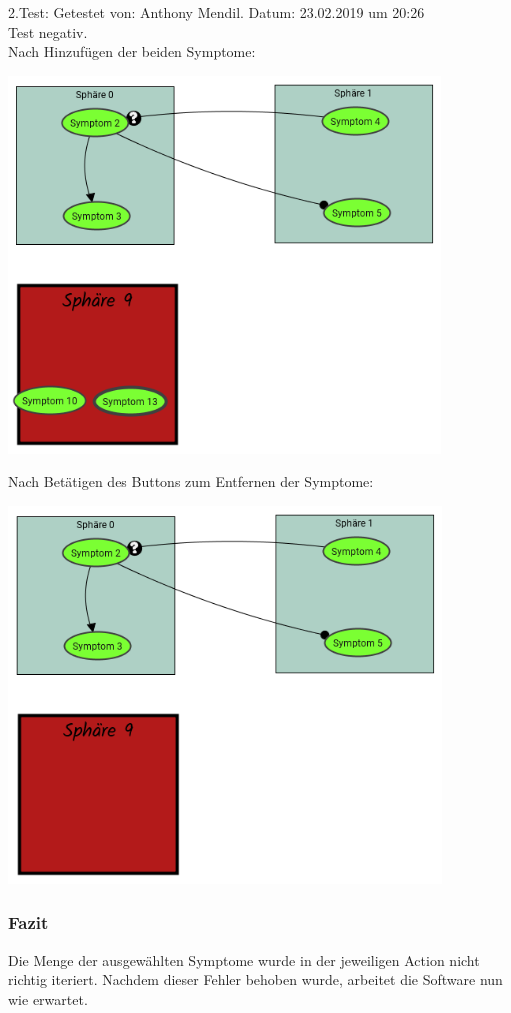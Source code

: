 \documentclass[enabledeprecatedfontcommands]{scrartcl}
\begin{document}
2.Test: Getestet von: Anthony Mendil. Datum: 23.02.2019 um 20:26 \\
Test negativ. \\
Nach Hinzufügen der beiden Symptome: 
\begin{center}
\includegraphics[height=10cm]{2_22vorher.PNG}
\end{center}
Nach Betätigen des Buttons zum Entfernen der Symptome: 
\begin{center}
\includegraphics[height=10cm]{2_22.PNG}
\end{center}
\subsubsection{Fazit}
Die Menge der ausgewählten Symptome wurde in der jeweiligen Action nicht richtig iteriert. Nachdem dieser Fehler behoben wurde, arbeitet die Software nun wie erwartet.
\end{document}
